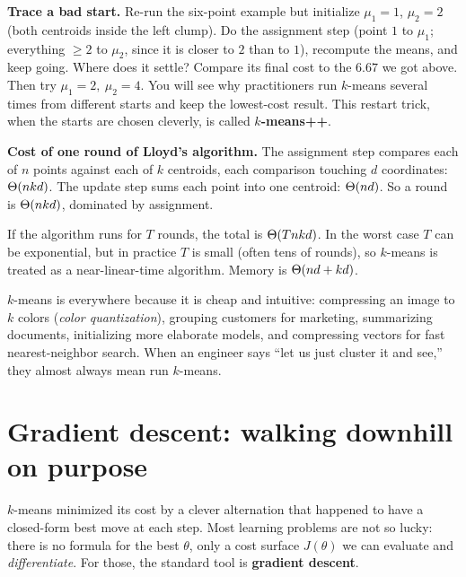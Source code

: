 \begin{labbox}
\textbf{Trace a bad start.} Re-run the six-point example but initialize
$\mu_1 = 1$, $\mu_2 = 2$ (both centroids inside the left clump). Do the
assignment step (point $1$ to $\mu_1$; everything $\ge 2$ to $\mu_2$, since it is
closer to $2$ than to $1$), recompute the means, and keep going. Where does it
settle? Compare its final cost to the $6.67$ we got above. Then try
$\mu_1 = 2,\ \mu_2 = 4$. You will see why practitioners run
$k$-means several times from different starts and keep the lowest-cost result.
This restart trick, when the starts are chosen cleverly, is called
\textbf{$k$-means++}.
\end{labbox}

\begin{complexitybox}
\textbf{Cost of one round of Lloyd's algorithm.} The assignment step compares
each of $n$ points against each of $k$ centroids, each comparison touching $d$
coordinates: $\Theta(nkd)$. The update step sums each point into one centroid:
$\Theta(nd)$. So a round is $\Theta(nkd)$, dominated by assignment.

If the algorithm runs for $T$ rounds, the total is $\Theta(Tnkd)$. In the worst
case $T$ can be exponential, but in practice $T$ is small (often tens of
rounds), so $k$-means is treated as a near-linear-time algorithm. Memory is
$\Theta(nd + kd)$.
\end{complexitybox}

\begin{aestheticbox}
$k$-means is everywhere because it is cheap and intuitive: compressing an image
to $k$ colors (\emph{color quantization}), grouping customers for marketing,
summarizing documents, initializing more elaborate models, and compressing
vectors for fast nearest-neighbor search. When an engineer says ``let us just
cluster it and see,'' they almost always mean run $k$-means.
\end{aestheticbox}

\section{Gradient descent: walking downhill on purpose}
\label{ch36:gradient-descent}

$k$-means minimized its cost by a clever alternation that happened to have a
closed-form best move at each step. Most learning problems are not so lucky:
there is no formula for the best $\theta$, only a cost surface $J(\theta)$ we
can evaluate and \emph{differentiate}. For those, the standard tool
is \textbf{gradient descent}.

